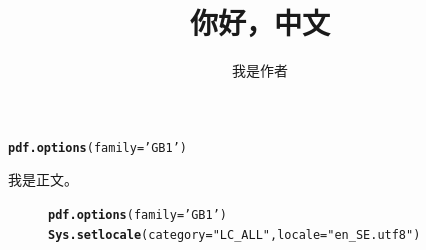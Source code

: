 \documentclass[twoside,UTF8]{ctexart}\usepackage[]{graphicx}\usepackage[]{color}
\makeatletter
\newcommand{\hlstr}[1]{\textcolor[rgb]{0.192,0.494,0.8}{#1}}%
\newcommand{\hlstd}[1]{\textcolor[rgb]{0.345,0.345,0.345}{#1}}%
\newcommand{\hlkwc}[1]{\textcolor[rgb]{0.333,0.667,0.333}{#1}}%
\newcommand{\hlkwd}[1]{\textcolor[rgb]{0.737,0.353,0.396}{\textbf{#1}}}%
\newenvironment{kframe}{%
 \def\at@end@of@kframe{}%
 \ifinner\ifhmode%
  \def\at@end@of@kframe{\end{minipage}}%
  \begin{minipage}{\columnwidth}%
 \fi\fi%
 \def\FrameCommand##1{\hskip\@totalleftmargin \hskip-\fboxsep
 \colorbox{shadecolor}{##1}\hskip-\fboxsep
     \hskip-\linewidth \hskip-\@totalleftmargin \hskip\columnwidth}%
 \MakeFramed {\advance\hsize-\width
   \@totalleftmargin\z@ \linewidth\hsize
   \@setminipage}}%
 {\par\unskip\endMakeFramed%
 \at@end@of@kframe}
\newenvironment{knitrout}{}{} %
\makeatother
\begin{document}
\begin{CJK}{UTF8}{}%

\title{你好，中文}
\author{我是作者}
\maketitle


\begin{knitrout}
\color{fgcolor}\begin{kframe}
\begin{alltt}
\hlkwd{pdf.options}\hlstd{(}\hlkwc{family}\hlstd{=}\hlstr{'GB1'}\hlstd{)}
\end{alltt}
\end{kframe}
\end{knitrout}

我是正文。

\begin{figure}
\begin{center}
\begin{knitrout}
\color{fgcolor}\begin{kframe}
\begin{alltt}
\hlkwd{pdf.options}\hlstd{(}\hlkwc{family}\hlstd{=}\hlstr{'GB1'}\hlstd{)}
\hlkwd{Sys.setlocale}\hlstd{(}\hlkwc{category} \hlstd{=} \hlstr{"LC_ALL"}\hlstd{,} \hlkwc{locale} \hlstd{=} \hlstr{"en_SE.utf8"}\hlstd{)}
\end{alltt}



\end{kframe}
\end{knitrout}
\end{center}
\end{figure}
\end{CJK}
\end{document}
